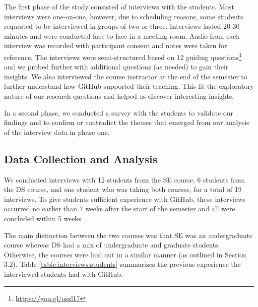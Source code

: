 The first phase of the study consisted of interviews with the students. Most interviews were one-on-one, however, due to scheduling reasons, some students requested to be interviewed in groups of two or three. Interviews lasted 20-30 minutes and were conducted face to face in a meeting room. Audio from each interview was recorded with participant consent and notes were taken for reference. The interviews were semi-structured based on 12 guiding questions\footnote{\url{https://goo.gl/oszl17}} and we probed further with additional questions (as needed) to gain their insights. We also interviewed the course instructor at the end of the semester to further understand how GitHub supported their teaching. This fit the exploratory nature of our research questions and helped us discover interesting insights.


In a second phase, we conducted a survey with the students to validate our findings and to confirm or contradict the themes that emerged from our analysis of the interview data in phase one.

\subsection{Data Collection and Analysis}
We conducted interviews with 12 students from the SE course, 6 students from the DS course, and one student who was taking both courses, for a total of 19 interviews.
To give students sufficient experience with GitHub, these interviews occurred no earlier than 7 weeks after the start of the semester and all were concluded within 5 weeks.

 The main distinction between the two courses was that SE was an undergraduate course whereas DS had a mix of undergraduate and graduate students. Otherwise, the courses were laid out in a similar manner (as outlined in Section 3.2). Table \ref{table:interviews:students} summarizes the previous experience the interviewed students had with GitHub.

